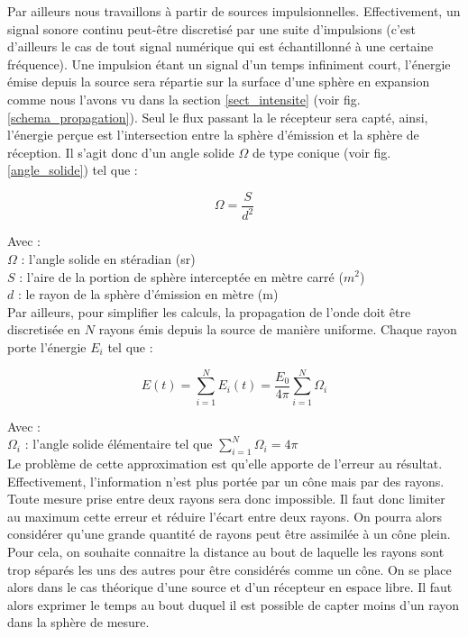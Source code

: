 Par ailleurs nous travaillons à partir de sources impulsionnelles. Effectivement, un signal sonore continu peut-être discretisé par une suite d'impulsions (c'est d'ailleurs le cas de tout signal numérique qui est échantillonné à une certaine fréquence). Une impulsion étant un signal d'un temps infiniment court, l'énergie émise depuis la source sera répartie sur la surface d'une sphère en expansion comme nous l'avons vu dans la section \ref{sect_intensite} (voir fig. \ref{schema_propagation}). Seul le flux passant la le récepteur sera capté, ainsi, l'énergie perçue est l'intersection entre la sphère d'émission et la sphère de réception. Il s'agit donc d'un angle solide $\Omega$ de type conique (voir fig. \ref{angle_solide}) tel que :

\begin{equation}
\Omega =\frac{S}{d^2}
\end{equation}

Avec  : \\
$\Omega$ : l'angle solide en stéradian (sr) \\
$S$ : l'aire de la portion de sphère interceptée en mètre carré ($m^2$) \\
$d$ : le rayon de la sphère d'émission en mètre (m) \\


Par ailleurs, pour simplifier les calculs, la propagation de l'onde doit être discretisée en $N$ rayons émis depuis la source de manière uniforme. Chaque rayon porte l'énergie $E_i$ tel que :

\begin{equation}
E(t) = \sum_{i=1}^N E_i(t) = \frac{E_0}{4\pi}  \sum_{i=1}^N \Omega_i
\end{equation}

Avec : \\
$\Omega_i$ : l'angle solide élémentaire tel que $ \sum_{i=1}^N \Omega_i = 4\pi$ \\



 Le problème de cette approximation est qu'elle apporte de l'erreur au résultat. Effectivement, l'information n'est plus portée par un cône mais par des rayons. Toute mesure prise entre deux rayons sera donc impossible. Il faut donc limiter au maximum cette erreur et réduire l'écart entre deux rayons. On pourra alors considérer qu'une grande quantité de rayons peut être assimilée à un cône plein. Pour cela, on souhaite connaitre la distance au bout de laquelle les rayons sont trop séparés les uns des autres pour être considérés comme un cône. On se place alors dans le cas théorique d'une source et d'un récepteur en espace libre. Il faut alors exprimer le temps au bout duquel il est possible de capter moins d'un rayon dans la sphère de mesure. 

